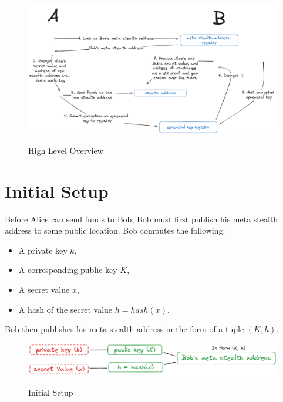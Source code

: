 \begin{figure}[h]
    \centering
    \includegraphics[scale=0.18]{assets/images/high-level.png}
    \caption{High Level Overview}
    \label{fig:hig-level}
	\cite{ButerinIncompleteGuide}
    \vspace{0.5cm}
\end{figure}

\pagebreak
\section{Initial Setup}

Before Alice can send funds to Bob, Bob must first publish his meta stealth
address to some public location. Bob computes the following:

\begin{itemize}
	\item A private key $k$,
	\item A corresponding public key $K$,
	\item A secret value $x$,
	\item A hash of the secret value $h = hash(x)$.
\end{itemize}

Bob then publishes his meta stealth address in the form of a tuple $(K, h)$.

\begin{figure}[h]
    \centering
    \includegraphics[scale=0.30]{assets/images/initial-setup.png}
    \caption{Initial Setup}
    \label{fig:initial-setup}
	\cite{ButerinIncompleteGuide}
    \vspace{0.5cm}
\end{figure}

